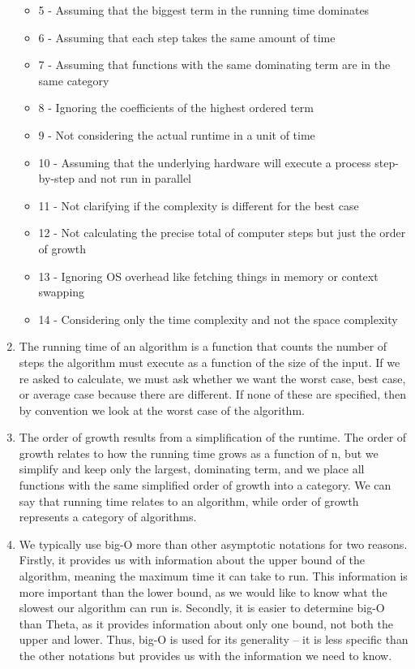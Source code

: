 \documentclass{article}
\begin{document}
\begin{enumerate}
\begin{itemize}
		\item 5 - Assuming that the biggest term in the running time dominates
		\item 6 - Assuming that each step takes the same amount of time
		\item 7 - Assuming that functions with the same dominating term are in the same category
		\item 8 - Ignoring the coefficients of the highest ordered term
		\item 9 - Not considering the actual runtime in a unit of time
		\item 10 - Assuming that the underlying hardware will execute a process step-by-step and not run in parallel
		\item 11 - Not clarifying if the complexity is different for the best case
		\item 12 - Not calculating the precise total of computer steps but just the order of growth
		\item 13 - Ignoring OS overhead like fetching things in memory or context swapping
		\item 14 - Considering only the time complexity and not the space complexity
	\end{itemize}
	\item The running time of an algorithm is a function that counts the number of steps the algorithm must execute as a function of the size of the input. If we re asked to calculate, we must ask whether we want the worst case, best case, or average case because there are different. If none of these are specified, then by convention we look at the worst case of the algorithm.
	\item The order of growth results from a simplification of the runtime. The order of growth relates to how the running time grows as a function of n, but we simplify and keep only the largest, dominating term, and we place all functions with the same simplified order of growth into a category. We can say that running time relates to an algorithm, while order of growth represents a category of algorithms.
	\item We typically use big-O more than other asymptotic notations for two reasons. Firstly, it provides us with information about the upper bound of the algorithm, meaning the maximum time it can take to run. This information is more important than the lower bound, as we would like to know what the slowest our algorithm can run is. Secondly, it is easier to determine big-O than Theta, as it provides information about only one bound, not both the upper and lower. Thus, big-O is used for its generality -- it is less specific than the other notations but provides us with the information we need to know.

\end{enumerate}
\end{document}
